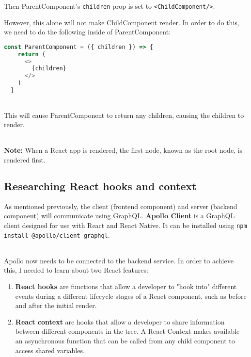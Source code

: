 \documentclass[../../main.tex]{subfiles}
\begin{document}
\noindent Then ParentComponent's \lstinline{children} prop is set to
\lstinline{<ChildComponent/>}.

\noindent However, this alone will not make ChildComponent render. In order to do this,
we need to do the following inside of ParentComponent:

\begin{lstlisting}[language=typescript]
  const ParentComponent = ({ children }) => {
    return (
      <>
        {children}
      </>
    )
  }
\end{lstlisting}

\noindent \\ This will cause ParentComponent to return any children,
causing the children to render.

\noindent \\ \textbf{Note:} When a React app is rendered, the first node,
known as the root node, is rendered first.


\subsection{Researching React hooks and context}


As mentioned previously, the client (frontend component) and server (backend component)
will communicate using GraphQL. \textbf{Apollo Client} is a GraphQL client designed for use with
React and React Native. It can be installed using
\lstinline[language=bash]{npm install @apollo/client graphql}.



\noindent \\ Apollo now needs to be connected to the backend service.
In order to achieve this, I needed to learn about two React features:

\begin{enumerate}
  \item \textbf{React hooks} are functions that allow a developer
        to "hook into" different events during a different lifecycle stages
        of a React component, such as before and after the initial render.

  \item \textbf{React context} are hooks that allow a developer
        to share information between different components in the tree.
        A React Context makes available an asynchronous function that
        can be called from any child component to access shared variables.
\end{enumerate}
\end{document}
